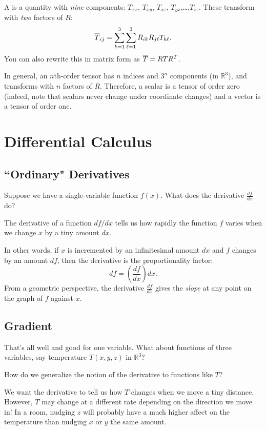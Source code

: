 \begin{definition}
A  is a quantity with \textit{nine} components: $T_{xx}$, $T_{xy}$, $T_{xz}$, $T_{yx}$,\dots ,$T_{zz}$. These transform with \textit{two} factors of $R$:
\[\overline{T}_{ij}=\sum_{k=1}^3\sum_{\ell=1}^3R_{ik}R_{j\ell}T_{k\ell}.\]
You can also rewrite this in matrix form as $\overline{T}=RTR^T$.
\end{definition}

In general, an $n$th-order tensor has $n$ indices and $3^n$ components (in $\mathbb{R}^3$), and transforms with $n$ factors of $R$. Therefore, a scalar is a tensor of order zero (indeed, note that scalars never change under coordinate changes) and a vector is a tensor of order one.

\section{Differential Calculus}

\subsection{``Ordinary" Derivatives}

Suppose we have a single-variable function $f(x)$. What does the derivative $\frac{df}{dx}$ do?

\begin{moral}
The derivative of a function $df/dx$ tells us how rapidly the function $f$ varies when we change $x$ by a tiny amount $dx$.
\end{moral}

In other words, if $x$ is incremented by an infinitesimal amount $dx$ and $f$ changes by an amount $df$, then the derivative is the proportionality factor:
\[df=\left(\frac{df}{dx}\right)dx.\]
From a geometric perspective, the derivative $\frac{df}{dx}$ gives the \textit{slope} at any point on the graph of $f$ against $x$.

\subsection{Gradient}

That's all well and good for one variable. What about functions of three variables, say temperature $T(x,y,z)$ in $\mathbb{R}^3$? 

How do we generalize the notion of the derivative to functions like $T$? 

We want the derivative to tell us how $T$ changes when we move a tiny distance. However, $T$ may change at a different rate depending on the direction we move in! In a room, nudging $z$ will probably have a much higher affect on the temperature than nudging $x$ or $y$ the same amount.

